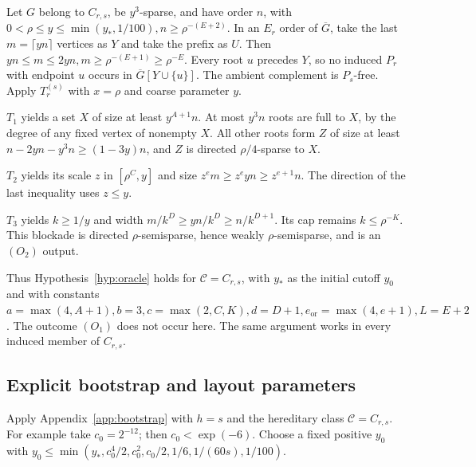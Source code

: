\documentclass[11pt,a4paper]{article}
\theoremstyle{definition}
\theoremstyle{remark}
\numberwithin{equation}{section}
\begin{document}
Let \(G\) belong to \(C_{r,\allowbreak s}\), be \(y^{3}\)-sparse, and have order \(n\), with \(0<\rho\le\allowbreak y\le\allowbreak \min (y_{*},\allowbreak 1/100),\allowbreak  n\ge\allowbreak \rho^{-(E+2)}\). In an \(E_{r}\) order of \(\overline{G}\), take the last \(m=\lceil yn\rceil\) vertices as \(Y\) and take the prefix as \(U\). Then \(yn\le\allowbreak m\le\allowbreak 2yn,\allowbreak  m\ge\allowbreak \rho^{-(E+1)}\ge\allowbreak \rho^{-E}\). Every root \(u\) precedes \(Y\), so no induced \(P_{r}\) with endpoint \(u\) occurs in \(\overline{G}[Y\cup\{u\}]\). The ambient complement is \(P_{s}\)-free. Apply \(T_{r}^{(s)}\) with \(x=\rho\) and coarse parameter \(y\).

\(T_{1}\) yields a set \(X\) of size at least \(y^{A+1}n\). At most \(y^{3} n\) roots are full to \(X\), by the degree of any fixed vertex of nonempty \(X\). All other roots form \(Z\) of size at least \(n-2yn-y^{3} n\ge\allowbreak (1-3y)n\), and \(Z\) is directed \(\rho/4\)-sparse to \(X\).

\(T_{2}\) yields its scale \(z\) in \([\rho^{C},\allowbreak y]\) and size \(z^{e} m\ge\allowbreak z^{e} y n\ge\allowbreak z^{e+1}n\). The direction of the last inequality uses \(z\le\allowbreak y\).

\(T_{3}\) yields \(k\ge\allowbreak 1/y\) and width \(m/k^{D}\ge\allowbreak yn/k^{D}\ge\allowbreak n/k^{D+1}\). Its cap remains \(k\le\allowbreak \rho^{-K}\). This blockade is directed \(\rho\)-semisparse, hence weakly \(\rho\)-semisparse, and is an \((O_{2})\) output.

Thus Hypothesis~\ref{hyp:oracle} holds for \(\mathcal C=C_{r,s}\), with \(y_{*}\) as the initial cutoff \(y_{0}\) and with constants \(a=\max (4,\allowbreak A+1),\allowbreak  b=3,\allowbreak  c=\max (2,\allowbreak C,\allowbreak K),\allowbreak  d=D+1,\allowbreak  e_{\mathrm{or}}=\max (4,\allowbreak e+1),\allowbreak  L=E+2\). The outcome \((O_{1})\) does not occur here. The same argument works in every induced member of \(C_{r,\allowbreak s}\).
\subsection{Explicit bootstrap and layout parameters}\label{subsec:tail-parameters}
Apply Appendix~\ref{app:bootstrap} with \(h=s\) and the hereditary class \(\mathcal C=C_{r,s}\). For example take \(c_{0}=2^{-12}\); then \(c_{0}<\exp (-6)\). Choose a fixed positive \(y_{0}\) with \(y_{0}\le\allowbreak \min (y_{*},\allowbreak c_{0}^{4}/2,\allowbreak c_{0}^{2},\allowbreak c_{0}/2,\allowbreak 1/6,\allowbreak 1/(60s),\allowbreak 1/100)\).
\end{document}
